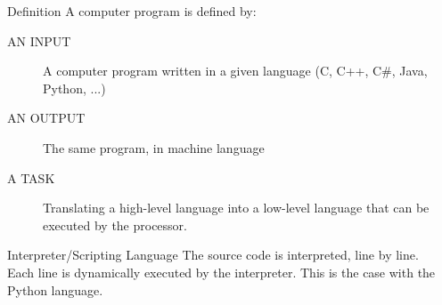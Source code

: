 \begin{frame}{Definition}
    A computer program is defined by:
    \begin{description}
        \item [AN INPUT] A computer program written in a given language (C, C++, C\#, Java, Python, ...)
        \item []
        \item [AN OUTPUT] The same program, in machine language
        \item []
        \item [A TASK] Translating a high-level language into a low-level language that can be executed by the processor.
    \end{description}
\end{frame}

\begin{frame}{Interpreter/Scripting Language}
    The source code is interpreted, line by line.\\
    Each line is dynamically executed by the interpreter.
    This is the case with the Python language.
\end{frame}